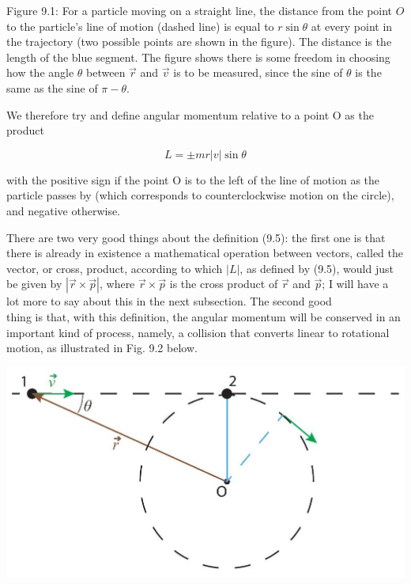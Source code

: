 \documentclass[10pt]{article}
\begin{document}
Figure 9.1: For a particle moving on a straight line, the distance from the point $O$ to the particle's line of motion (dashed line) is equal to $r \sin \theta$ at every point in the trajectory (two possible points are shown in the figure). The distance is the length of the blue segment. The figure shows there is some freedom in choosing how the angle $\theta$ between $\vec{r}$ and $\vec{v}$ is to be measured, since the sine of $\theta$ is the same as the sine of $\pi-\theta$.

We therefore try and define angular momentum relative to a point O as the product


\begin{equation*}
L= \pm m r|v| \sin \theta \tag{9.5}
\end{equation*}


with the positive sign if the point O is to the left of the line of motion as the particle passes by (which corresponds to counterclockwise motion on the circle), and negative otherwise.

There are two very good things about the definition (9.5): the first one is that there is already in existence a mathematical operation between vectors, called the vector, or cross, product, according to which $|L|$, as defined by (9.5), would just be given by $|\vec{r} \times \vec{p}|$, where $\vec{r} \times \vec{p}$ is the cross product of $\vec{r}$ and $\vec{p}$; I will have a lot more to say about this in the next subsection. The second good\\
thing is that, with this definition, the angular momentum will be conserved in an important kind of process, namely, a collision that converts linear to rotational motion, as illustrated in Fig. 9.2 below.

\begin{center}
\includegraphics[max width=\textwidth]{2024_09_14_9969b06773f10b6936e8g-213}
\end{center}
\end{document}
